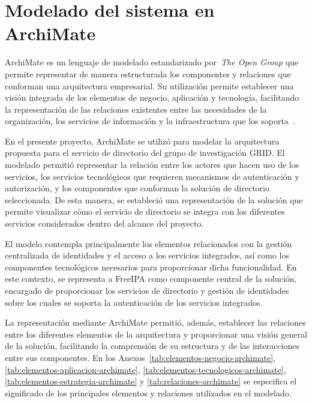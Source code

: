 \section{Modelado del sistema en ArchiMate}\label{sec:archimate-modelado}

ArchiMate es un lenguaje de modelado estandarizado por~\textit{The Open Group} que permite representar de manera estructurada los componentes y relaciones que conforman una arquitectura empresarial. Su utilización permite establecer una visión integrada de los elementos de negocio, aplicación y tecnología, facilitando la representación de las relaciones existentes entre las necesidades de la organización, los servicios de información y la infraestructura que los soporta~\citep{opengroup_archimate_overview}.

En el presente proyecto, ArchiMate se utilizó para modelar la arquitectura propuesta para el servicio de directorio del grupo de investigación \ac{GRID}. El modelado permitió representar la relación entre los actores que hacen uso de los servicios, los servicios tecnológicos que requieren mecanismos de autenticación y autorización, y los componentes que conforman la solución de directorio seleccionada. De esta manera, se estableció una representación de la solución que permite visualizar cómo el servicio de directorio se integra con los diferentes servicios considerados dentro del alcance del proyecto.

El modelo contempla principalmente los elementos relacionados con la gestión centralizada de identidades y el acceso a los servicios integrados, así como los componentes tecnológicos necesarios para proporcionar dicha funcionalidad. En este contexto, se representa a FreeIPA como componente central de la solución, encargado de proporcionar los servicios de directorio y gestión de identidades sobre los cuales se soporta la autenticación de los servicios integrados.

La representación mediante ArchiMate permitió, además, establecer las relaciones entre los diferentes elementos de la arquitectura y proporcionar una visión general de la solución, facilitando la comprensión de su estructura y de las interacciones entre sus componentes. En los Anexos~\ref{tab:elementos-negocio-archimate}, \ref{tab:elementos-aplicacion-archimate}, \ref{tab:elementos-tecnologicos-archimate}, \ref{tab:elementos-estrategia-archimate} y \ref{tab:relaciones-archimate} se especifica el significado de los principales elementos y relaciones utilizados en el modelado.
